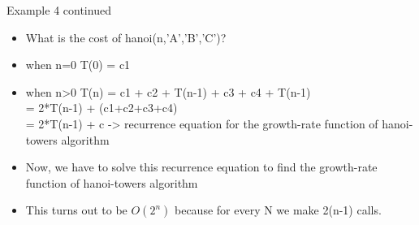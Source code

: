 \documentclass{beamer}
\begin{document}
\begin{frame}{Example 4 continued}
\begin{itemize}
\item What is the cost of hanoi(n,'A','B','C')?
\item when n=0
      T(0) = c1 
\item when n>0
      T(n) = c1 + c2 + T(n-1) + c3 + c4 + T(n-1) \\
           = 2*T(n-1) + (c1+c2+c3+c4) \\
           = 2*T(n-1) + c   -> recurrence equation for the growth-rate function of hanoi-towers algorithm  \\
\item Now, we have to solve this recurrence equation to find the growth-rate function of hanoi-towers algorithm
\item This turns out to be $O(2^n)$ because for every N we make 2(n-1) calls.
\end{itemize}
\end{frame}

\end{document}
